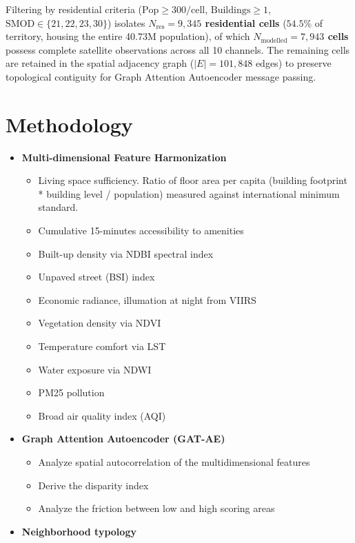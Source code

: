 \documentclass[11pt,a4paper]{article}
\begin{document}
Filtering by residential criteria ($\text{Pop} \ge 300/\text{cell}$, $\text{Buildings} \ge 1$, $\text{SMOD} \in \{21, 22, 23, 30\}$) isolates \textbf{$N_{\text{res}} = 9,345$ residential cells} ($54.5\%$ of territory, housing the entire 40.73M population), of which \textbf{$N_{\text{modelled}} = 7,943$ cells} possess complete satellite observations across all 10 channels. The remaining cells are retained in the spatial adjacency graph ($|E| = 101,848$ edges) to preserve topological contiguity for Graph Attention Autoencoder message passing.

\section{Methodology}
\begin{itemize}[leftmargin=*]
    \item \textbf{Multi-dimensional Feature Harmonization}
    \begin{itemize}
        \item Living space sufficiency. Ratio of floor area per capita (building footprint * building level / population) measured against international minimum standard.
        \item Cumulative 15-minutes accessibility to amenities
        \item Built-up density via NDBI spectral index
        \item Unpaved street (BSI) index
        \item Economic radiance, illumation at night from VIIRS
        \item Vegetation density via NDVI
        \item Temperature comfort via LST
        \item Water exposure via NDWI
        \item PM25 pollution
        \item Broad air quality index (AQI)
    \end{itemize}
    \item \textbf{Graph Attention Autoencoder (GAT-AE)}
    \begin{itemize}
        \item Analyze spatial autocorrelation of the multidimensional features
        \item Derive the disparity index
        \item Analyze the friction between low and high scoring areas
    \end{itemize}
    \item \textbf{Neighborhood typology}

\end{itemize}
\end{document}
